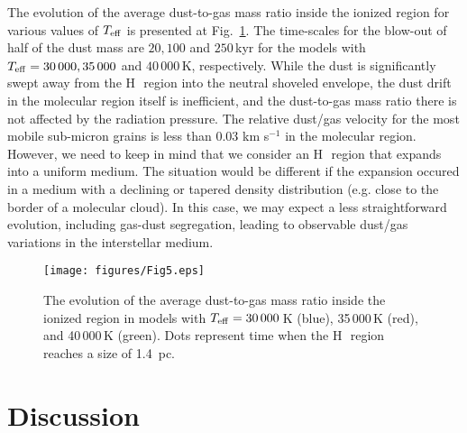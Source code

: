 \documentclass[a4paper,fleqn,usenatbib]{mnras}
\newcommand{\hii}    {H\,{\sc{ii}}~}
\begin{document}
The evolution of the average dust-to-gas mass ratio inside the ionized region for various values of $T_{\rm eff}$ is presented at Fig.~\ref{fig5}. The time-scales for the blow-out of half of the dust mass are $20, 100$ and $250$\,kyr for the models with $T_{\rm eff}=30\,000, 35\,000$ and $40\,000$\,K, respectively. While the dust is significantly swept away from the \hii region into the neutral shoveled envelope, the dust drift in the molecular region itself is inefficient, and the dust-to-gas mass ratio there is not affected by the radiation pressure. The relative dust/gas velocity for the most mobile sub-micron grains is less than 0.03 km s$^{-1}$ in the molecular region. However, we need to keep in mind that we consider an \hii region that expands into a uniform medium. The situation would be different if the expansion occured in a medium with a declining or tapered density distribution (e.g. close to the border of a molecular cloud). In this case, we may expect a less straightforward evolution, including gas-dust segregation, leading to observable dust/gas variations in the interstellar medium.


\begin{figure}
\centering
\texttt{[image: figures/Fig5.eps]}
\caption{The evolution of the average dust-to-gas mass ratio inside the ionized region in models with $T_{\rm eff}=30\,000$\,K (blue), 35\,000\,K (red), and 40\,000\,K (green). Dots represent time when the \hii region reaches a size of 1.4~pc.}
\label{fig5}
\end{figure}

\vspace{-0.5cm}
\section{Discussion}
\end{document}
